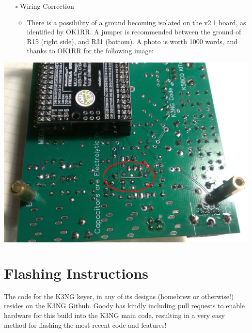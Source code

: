 \documentclass[11pt]{article}
\begin{document}
\newpage
\begin{itemize}
\item[{$\square$}] Wiring Correction

\begin{itemize}
\item There is a possibility of a ground becoming isolated on the v2.1 board, as identified by OK1RR.  A jumper is recommended between the ground of R15 (right side), and R31 (bottom).  A photo is worth 1000 words, and thanks to OK1RR for the following image:
\end{itemize}
\end{itemize}
\begin{center}
\includegraphics[width=.9\linewidth]{../png/3.5/wiring_correction.jpg}
\end{center}

\newpage
\section{Flashing Instructions}
\label{sec:org9080bf5}
The code for the K3NG keyer, in any of its designs (homebrew or otherwise!) resides on the \href{https://github.com/k3ng/k3ng\_cw\_keyer}{K3NG Github}.  Goody has kindly including pull requests to enable hardware for this build into the K3NG main code, resulting in a very easy method for flashing the most recent code and features!
\end{document}

